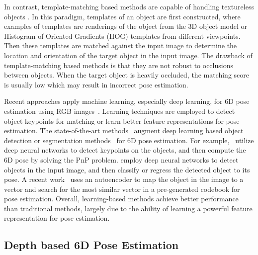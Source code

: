 \documentclass[twocolumn]{svjour3}
\begin{document}
In contrast, template-matching based methods are capable of handling textureless objects \citep{jurie2001real,liu2010fast,gu2010discriminative,hinterstoisser2012gradient}. In this paradigm, templates of an object are first constructed, where examples of templates are renderings of the object from the 3D object model or Histogram of Oriented Gradients (HOG) \citep{dalal2005histograms} templates from different viewpoints. Then these templates are matched against the input image to determine the location and orientation of the target object in the input image. The drawback of template-matching based methods is that they are not robust to occlusions between objects. When the target object is heavily occluded, the matching score is usually low which may result in incorrect pose estimation.


Recent approaches apply machine learning, especially deep learning, for 6D pose estimation using RGB images~\citep{Brachmann2014Learning6O,krull2015learning}. Learning techniques are employed to detect object keypoints for matching or learn better feature representations for pose estimation. The state-of-the-art methods~\citep{rad2017bb8,kehl2017ssd,tekin2017real,xiang2017posecnn,tremblay2018deep} augment deep learning based object detection or segmentation methods~\citep{girshick2015fast,long2015fully,liu2016ssd,redmon2016you} for 6D pose estimation. For example,~\citep{rad2017bb8,tjaden2017real,tremblay2018deep} utilize deep neural networks to detect keypoints on the objects, and then compute the 6D pose by solving the PnP problem. \citep{kehl2017ssd,xiang2017posecnn} employ deep neural networks to detect objects in the input image, and then classify or regress the detected object to its pose.  A recent work~\citep{sundermeyer2018implicit} uses an autoencoder to map the object in the image to a vector and search for the most similar vector in a pre-generated codebook for pose estimation. Overall, learning-based methods achieve better performance than traditional methods, largely due to the ability of learning a powerful feature representation for pose estimation. 


\subsection{Depth based 6D Pose Estimation}
\end{document}
